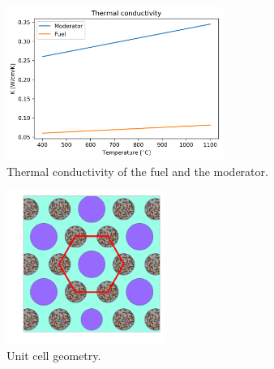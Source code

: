\documentclass[11pt,letterpaper]{article}
\begin{document}
	\begin{figure}[htbp!]
		\centering
		\includegraphics[height=5cm]{pmr-K}
		\caption{Thermal conductivity of the fuel and the moderator.}
		\label{fig:cg-advec4}
	\end{figure}

	\begin{figure}[htbp!]
		\centering
		\includegraphics[height=5cm]{standard2}
		\caption{Unit cell geometry.}
		\label{fig:unitcell}
	\end{figure}
\end{document}

